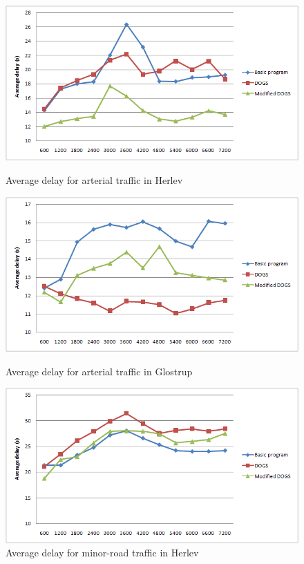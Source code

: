 \begin{figure}[ht]

    \begin{minipage}[b]{0.5\linewidth}

\centering
\includegraphics[scale=0.25]{delay_arterial_herlev.png}
\caption{Average delay for arterial traffic in Herlev}
\label{fig:delay_arterial_herlev}

    \end{minipage}
    \hspace{0.5cm}
    \begin{minipage}[b]{0.5\linewidth}

\centering
\includegraphics[scale=0.25]{delay_arterial_glostrup.PNG}
\caption{Average delay for arterial traffic in Glostrup}
\label{fig:delay_arterial_glostrup}

    \end{minipage}
    
        \begin{minipage}[b]{0.5\linewidth}

\centering
\includegraphics[scale=0.25]{delay_minor-road_herlev.PNG}
\caption{Average delay for minor-road traffic in Herlev}
\label{fig:delay_minor-road_herlev}


\end{minipage}
\end{figure}
